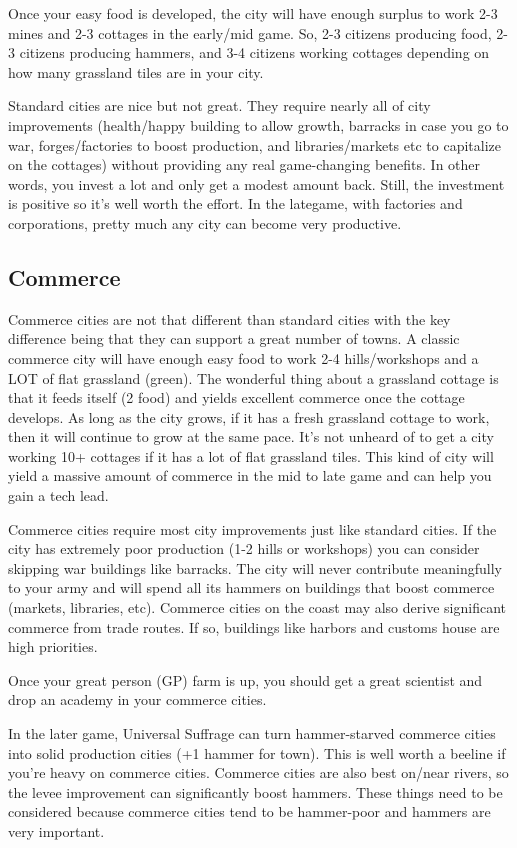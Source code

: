 \documentclass[10pt]{article}
\begin{document}
Once your easy food is developed, the city will have enough surplus to work 2-3
mines and 2-3 cottages in the early/mid game. So, 2-3 citizens producing food,
2-3 citizens producing hammers, and 3-4 citizens working cottages depending on
how many grassland tiles are in your city.

Standard cities are nice but not great. They require nearly all of
city improvements (health/happy building to allow growth, barracks in
case you go to war, forges/factories to boost production, and
libraries/markets etc to capitalize on the cottages) without providing
any real game-changing benefits. In other words, you invest a lot and
only get a modest amount back. Still, the investment is positive so
it's well worth the effort.  In the lategame, with factories and
corporations, pretty much any city can become very productive.

\subsection*{Commerce}

Commerce cities are not that different than standard cities with the key difference
being that they can support a great number of towns. A classic commerce city will
have enough easy food to work 2-4 hills/workshops and a LOT of flat grassland (green).
The wonderful thing about a grassland cottage is that it feeds itself (2 food) and
yields excellent commerce once the cottage develops. As long as the city grows, if it
has a fresh grassland cottage to work, then it will continue to grow at the same pace.
It's not unheard of to get a city working 10+ cottages if it has a lot of flat grassland
tiles. This kind of city will yield a massive amount of commerce in the mid to late game
and can help you gain a tech lead.

Commerce cities require most city improvements just like standard cities. If the city
has extremely poor production (1-2 hills or workshops) you can consider skipping war
buildings like barracks. The city will never contribute meaningfully to your army and
will spend all its hammers on buildings that boost commerce (markets, libraries, etc).
Commerce cities on the coast may also derive significant commerce from trade routes.
If so, buildings like harbors and customs house are high priorities.

Once your great person (GP) farm is up, you should get a great scientist and drop an
academy in your commerce cities.

In the later game, Universal Suffrage can turn hammer-starved commerce cities into
solid production cities (+1 hammer for town). This is well worth a beeline if you're
heavy on commerce cities. Commerce cities are also best on/near rivers, so the levee
improvement can significantly boost hammers. These things need to be considered because
commerce cities tend to be hammer-poor and hammers are very important.
\end{document}
